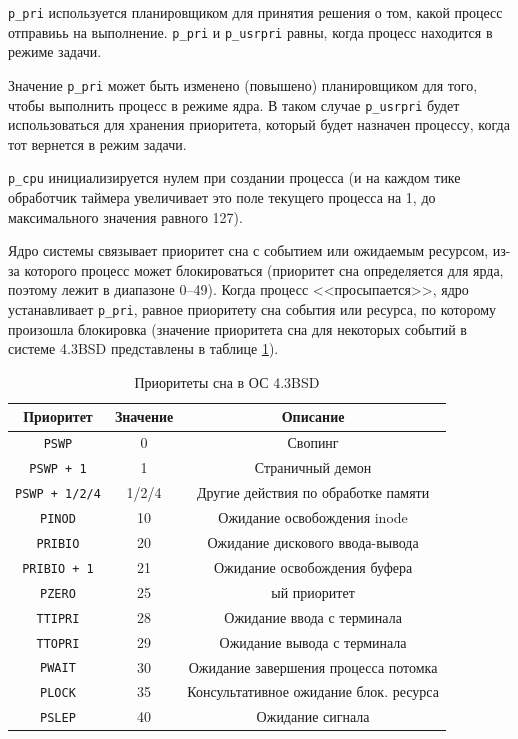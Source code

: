 \documentclass[14pt]{extarticle}
\begin{document}
\texttt{p\_pri} используется планировщиком для принятия решения о том, какой
процесс отправиьь на выполнение. \texttt{p\_pri} и \texttt{p\_usrpri} равны,
когда процесс находится в режиме задачи. 

Значение \texttt{p\_pri} может быть изменено (повышено) планировщиком для того,
чтобы выполнить процесс в режиме ядра. В таком случае \texttt{p\_usrpri} будет
использоваться для хранения приоритета, который будет назначен процессу, когда
тот вернется в режим задачи.

\texttt{p\_cpu} инициализируется нулем при создании процесса (и на каждом тике
обработчик таймера увеличивает это поле текущего процесса на 1, до
максимального значения равного 127).

Ядро системы связывает приоритет сна с событием или ожидаемым ресурсом, из-за
которого процесс может блокироваться (приоритет сна определяется для ярда,
поэтому лежит в диапазоне 0--49). Когда процесс <<просыпается>>, ядро
устанавливает \texttt{p\_pri}, равное приоритету сна события или ресурса, по
которому произошла блокировка (значение приоритета сна для некоторых событий в
системе 4.3BSD представлены в таблице \ref{tab:bsd}).

\begin{table}[h!]
    \caption{Приоритеты сна в ОС 4.3BSD}
    \begin{tabular}{|c|c|c|}
        \hline
        \textbf{Приоритет} & \textbf{Значение} & \textbf{Описание} \\
        \hline
        \texttt{PSWP} & 0 & Свопинг \\
        \hline
        \texttt{PSWP + 1} & 1 & Страничный демон \\
        \hline
        \texttt{PSWP + 1/2/4} & 1/2/4 & Другие действия по обработке памяти \\
        \hline
        \texttt{PINOD} & 10 & Ожидание освобождения inode \\
        \hline
        \texttt{PRIBIO} & 20 & Ожидание дискового ввода-вывода \\
        \hline
        \texttt{PRIBIO + 1} & 21 & Ожидание освобождения буфера \\
        \hline
        \texttt{PZERO} & 25 & ый приоритет \\
        \hline
        \texttt{TTIPRI} & 28 & Ожидание ввода с терминала \\
        \hline
        \texttt{TTOPRI} & 29 & Ожидание вывода с терминала \\
        \hline 
        \texttt{PWAIT} & 30 & Ожидание завершения процесса потомка \\
        \hline
        \texttt{PLOCK} & 35 & Консультативное ожидание блок. ресурса \\
        \hline
        \texttt{PSLEP} & 40 & Ожидание сигнала \\
        \hline
    \end{tabular}
    \label{tab:bsd}
\end{table}
\end{document}
